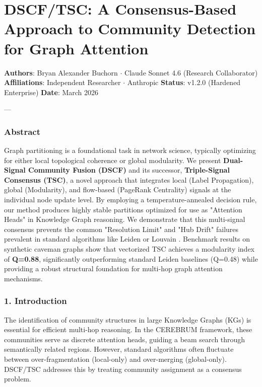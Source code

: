 \section{DSCF/TSC: A Consensus-Based Approach to Community Detection for Graph Attention}

\textbf{Authors}: Bryan Alexander Buchorn $\cdot$ Claude Sonnet 4.6 (Research Collab\-orator)  
\textbf{Affili\-ations}: Independent Researcher $\cdot$ Anthropic  
\textbf{Status}: v1.2.0 (Hardened Enterprise)  
\textbf{Date}: March 2026

---

\subsubsection{Abstract}
Graph parti\-tioning is a found\-ational task in network science, typically optimizing for either local topological coherence or global modularity. We present \textbf{Dual-Signal Community Fusion (DSCF)} and its successor, \textbf{Triple-Signal Consensus (TSC)}, a novel approach that integrates local (Label Propagation), global (Modularity), and flow-based (PageRank Centrality) signals at the individual node update level. By employing a temperature-annealed decision rule, our method produces highly stable partitions optimized for use as "Attention Heads" in Knowledge Graph reasoning. We demonstrate that this multi-signal consensus prevents the common "Resolution Limit" and "Hub Drift" failures prevalent in standard algorithms like Leiden \cite{traag2019louvain} or Louvain \cite{blondel2008louvain}. Benchmark results on synthetic caveman graphs show that vectorized TSC achieves a modularity index of \textbf{Q=0.88}, signi\-ficantly outpe\-rforming standard Leiden baselines (Q=0.48) while providing a robust structural foundation for multi-hop graph attention mechanisms.

\subsubsection{1. Introd\-uction}
The ident\-ification of community structures in large Knowledge Graphs (KGs) is essential for efficient multi-hop reasoning. In the CEREBRUM framework, these communities serve as discrete attention heads, guiding a beam search through seman\-tically related regions. However, standard algorithms often fluctuate between over-fragm\-entation (local-only) and over-merging (global-only). DSCF/TSC addresses this by treating community assignment as a consensus problem.

